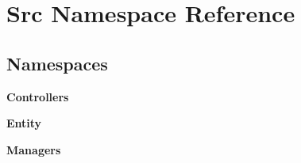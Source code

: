 \section{Src Namespace Reference}
\label{namespace_src}
\subsection*{Namespaces}
\begin{DoxyCompactItemize}
\item 
 \textbf{ Controllers}
\item 
 \textbf{ Entity}
\item 
 \textbf{ Managers}
\end{DoxyCompactItemize}
